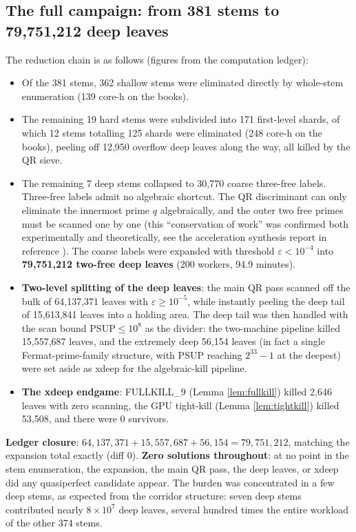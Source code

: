 \documentclass[11pt]{article}
\theoremstyle{remark}
\newcommand{\PSUP}{\mathrm{PSUP}}
\begin{document}
\subsection{The full campaign: from 381 stems to 79,751,212 deep leaves}\label{sec:campaign}

The reduction chain is as follows (figures from the computation ledger):

\begin{itemize}
\item Of the 381 stems, 362 shallow stems were eliminated directly by whole-stem enumeration (139 core-h on the books).
\item The remaining 19 hard stems were subdivided into 171 first-level shards, of which 12 stems totalling 125 shards were eliminated (248 core-h on the books), peeling off 12,950 overflow deep leaves along the way, all killed by the QR sieve.
\item The remaining 7 deep stems collapsed to 30,770 coarse three-free labels. Three-free labels admit no algebraic shortcut. The QR discriminant can only eliminate the innermost prime $q$ algebraically, and the outer two free primes must be scanned one by one (this ``conservation of work'' was confirmed both experimentally and theoretically, see the acceleration synthesis report in reference \cite{internal}). The coarse labels were expanded with threshold $\varepsilon < 10^{-4}$ into \textbf{79,751,212 two-free deep leaves} (200 workers, 94.9 minutes).
\item \textbf{Two-level splitting of the deep leaves}: the main QR pass scanned off the bulk of 64,137,371 leaves with $\varepsilon \ge 10^{-5}$, while instantly peeling the deep tail of 15,613,841 leaves into a holding area. The deep tail was then handled with the scan bound $\PSUP \le 10^8$ as the divider: the two-machine pipeline killed 15,557,687 leaves, and the extremely deep 56,154 leaves (in fact a single Fermat-prime-family structure, with $\PSUP$ reaching $2^{33}-1$ at the deepest) were set aside as xdeep for the algebraic-kill pipeline.
\item \textbf{The xdeep endgame}: FULLKILL\_9 (Lemma \ref{lem:fullkill}) killed 2,646 leaves with zero scanning, the GPU tight-kill (Lemma \ref{lem:tightkill}) killed 53,508, and there were 0 survivors.
\end{itemize}

\textbf{Ledger closure}: $64{,}137{,}371 + 15{,}557{,}687 + 56{,}154 = 79{,}751{,}212$, matching the expansion total exactly (diff 0). \textbf{Zero solutions throughout}: at no point in the stem enumeration, the expansion, the main QR pass, the deep leaves, or xdeep did any quasiperfect candidate appear. The burden was concentrated in a few deep stems, as expected from the corridor structure: seven deep stems contributed nearly $8 \times 10^7$ deep leaves, several hundred times the entire workload of the other 374 stems.
\end{document}
